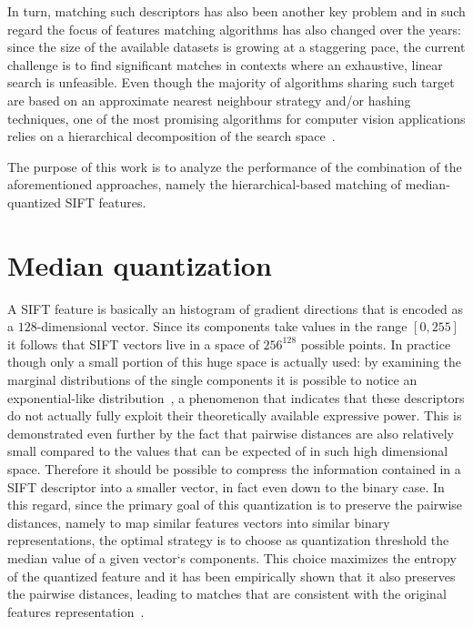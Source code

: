 \documentclass[a4paper, 11pt, oneside]{article}
\begin{document}
In turn, matching such descriptors has also been another key problem and in such regard the focus of features matching algorithms has also changed over the years: since the size of the available datasets is growing at a staggering pace, the current challenge is to find significant matches in contexts where an exhaustive, linear search is unfeasible. Even though the majority of algorithms sharing such target are based on an approximate nearest neighbour strategy and/or hashing techniques, one of the most promising algorithms for computer vision applications relies on a hierarchical decomposition of the search space~\cite{muja2012fast}.


The purpose of this work is to analyze the performance of the combination of the aforementioned approaches, namely the hierarchical-based matching of median-quantized SIFT features.
\section*{Median quantization}
A SIFT feature is basically an histogram of gradient directions that is encoded as a $128$-dimensional vector. Since its components take values in the range $[0, 255]$ it follows that SIFT vectors live in a space of $256^{128}$ possible points. In practice though only a small portion of this huge space is actually used: by examining the marginal distributions of the single components it is possible to notice an exponential-like distribution~\cite{peker2011binary}, a phenomenon that indicates that these descriptors do not actually fully exploit their theoretically available expressive power. This is demonstrated even further by the fact that pairwise distances are also relatively small compared to the values that can be expected of in such high dimensional space. Therefore it should be possible to compress the information contained in a SIFT descriptor into a smaller vector, in fact even down to the binary case. In this regard, since the primary goal of this quantization is to preserve the pairwise distances, namely to map similar features vectors into similar binary representations, the optimal strategy is to choose as quantization threshold the median value of a given vector`s components. This choice maximizes the entropy of the quantized feature and it has been empirically shown that it also preserves the pairwise distances, leading to matches that are consistent with the original features representation~\cite{peker2011binary}.
\end{document}
